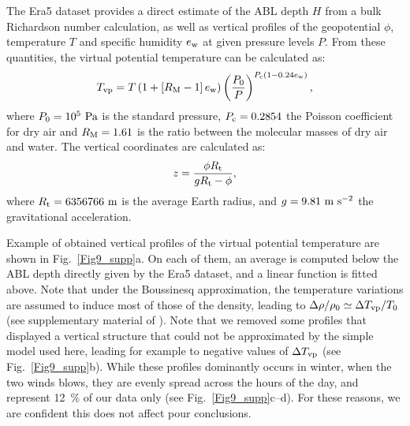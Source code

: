 The Era5 dataset provides a direct estimate of the ABL depth $H$ from a bulk Richardson number calculation, as well as vertical profiles of the geopotential $\phi$, temperature $T$ and specific humidity $e_{\textup{w}}$ at given pressure levels $P$. From these quantities, the virtual potential temperature can be calculated as:
\begin{equation}
  T_{\textup{vp}} = T\left(1 + \left[R_{\textup{M}} - 1\right]e_{\textup{w}}\right)\left(\frac{P_{0}}{P}\right)^{P_{\textup{c}}(1 - 0.24e_{\textup{w}})},
\end{equation}
where $P_{0} = 10^{5}~\textup{Pa}$ is the standard pressure, $P_{\textup{c}} = 0.2854$ the Poisson coefficient for dry air and $R_{\textup{M}}=1.61$ is the ratio between the molecular masses of dry air and water. The vertical coordinates are calculated as:
\begin{equation}
  z = \frac{\phi R_{\textup{t}}}{g R_{\textup{t}} - \phi},
\end{equation}
where $R_{\textup{t}} = 6356766~\textup{m}$ is the average Earth radius, and $g = 9.81~\textup{m}~\textup{s}^{-2}$ the gravitational acceleration.

Example of obtained vertical profiles of the virtual potential temperature are shown in Fig.~\ref{Fig9_supp}a. On each of them, an average is computed below the ABL depth directly given by the Era5 dataset, and a linear function is fitted above. Note that under the Boussinesq approximation, the temperature variations are assumed to induce most of those of the density, leading to $\Delta\rho/\rho_{0} \simeq \Delta T_{\textup{vp}}/T_{0}$ (see supplementary material of \citep{andreotti2009}). Note that we removed some profiles that displayed a vertical structure that could not be approximated by the simple model used here, leading for example to negative values of $\Delta T_{\textup{vp}}$ (see Fig.~\ref{Fig9_supp}b). While these profiles dominantly occurs in winter, when the two winds blows, they are evenly spread across the hours of the day, and represent 12~\% of our data only (see Fig.~\ref{Fig9_supp}c--d). For these reasons, we are confident this does not affect pour conclusions.

